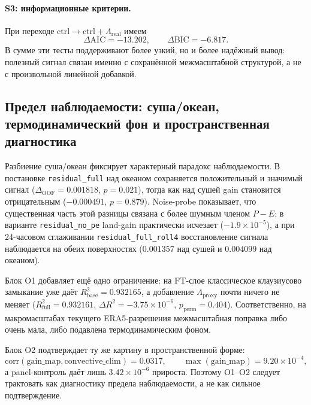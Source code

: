 \documentclass[11pt,a4paper]{article}
\theoremstyle{definition}
\theoremstyle{plain}
\theoremstyle{remark}
\begin{document}
\paragraph{S3: информационные критерии.}
При переходе \(\mathrm{ctrl}\to \mathrm{ctrl}+\Lambda_{\mathrm{real}}\) имеем
\[
\Delta \mathrm{AIC}=-13.202,\qquad \Delta \mathrm{BIC}=-6.817.
\]
В сумме эти тесты поддерживают более узкий, но и более надёжный вывод:
полезный сигнал связан именно с сохранённой межмасштабной структурой, а не с произвольной линейной добавкой.

\subsection{Предел наблюдаемости: суша/океан, термодинамический фон и пространственная диагностика}

Разбиение суша/океан фиксирует характерный парадокс наблюдаемости.
В постановке \texttt{residual\_full} над океаном сохраняется положительный и значимый сигнал
($\Delta_{\mathrm{OOF}}=0.001818$, $p=0.021$),
тогда как над сушей gain становится отрицательным
($-0.000491$, $p=0.879$).
Noise-probe показывает, что существенная часть этой разницы связана с более шумным членом $P-E$:
в варианте \texttt{residual\_no\_pe} land-gain практически исчезает
($-1.9\times10^{-5}$),
а при 24-часовом сглаживании \texttt{residual\_full\_roll4} восстановление сигнала наблюдается на обеих поверхностях
($0.001357$ над сушей и $0.004099$ над океаном).

Блок O1 добавляет ещё одно ограничение: на FT-слое классическое клаузиусово замыкание уже даёт
$R^2_{\mathrm{base}}=0.932165$,
а добавление $\Lambda_{\mathrm{proxy}}$ почти ничего не меняет
($R^2_{\mathrm{full}}=0.932161$, $\Delta R^2=-3.75\times10^{-6}$, $p_{\mathrm{perm}}=0.404$).
Соответственно, на макромасштабах текущего ERA5-разрешения межмасштабная поправка либо очень мала, либо подавлена термодинамическим фоном.

Блок O2 подтверждает ту же картину в пространственной форме:
\[
\mathrm{corr}(\mathrm{gain\_map},\mathrm{convective\_clim})=0.0317,\qquad
\max(\mathrm{gain\_map})=9.20\times10^{-4},
\]
а panel-контроль даёт лишь $3.42\times10^{-6}$ прироста.
Поэтому O1--O2 следует трактовать как диагностику предела наблюдаемости, а не как сильное подтверждение.
\end{document}
